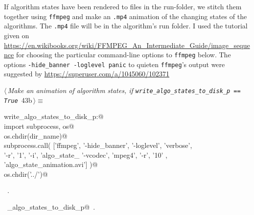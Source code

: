 \documentclass[11.5pt]{report}
\begin{document}
\vspace{-0.8cm}\newchunk If algorithm states have been rendered to files in the run-folder, we stitch them together using \verb|ffmpeg|
and make an \verb|.mp4| animation of the changing states of the algorithms. The \verb|.mp4| file will be in the algorithm's
run folder. I used the  tutorial given on \url{https://en.wikibooks.org/wiki/FFMPEG_An_Intermediate_Guide/image_sequence}
for choosing the particular command-line options to \verb|ffmpeg| below. The options \texttt{-hide\_banner -loglevel panic} 
to quieten \verb|ffmpeg|'s output were suggested by  \url{https://superuser.com/a/1045060/102371} 


\begin{flushleft} \small\label{scrap60}\raggedright\small
{} $\langle\,${\itshape Make an animation of algorithm states, if \verb|write_algo_states_to_disk_p == True|}\nobreak\ {\footnotesize {43b}}$\,\rangle\equiv$
\vspace{-1ex}
\begin{list}{}{} \item
\mbox{}\verb@if write_algo_states_to_disk_p:@\\
\mbox{}\verb@     import subprocess, os@\\
\mbox{}\verb@     os.chdir(dir_name)@\\
\mbox{}\verb@     subprocess.call( ['ffmpeg',  '-hide_banner', '-loglevel', 'verbose', \@\\
\mbox{}\verb@                       '-r', '1',  '-i', 'algo_state_%05d.png', \@\\
\mbox{}\verb@                       '-vcodec', 'mpeg4', '-r', '10' , \@\\
\mbox{}\verb@                       'algo_state_animation.avi']  )@\\
\mbox{}\verb@     os.chdir('../')@\\
\mbox{}\verb@@{\NWsep}
\end{list}
\vspace{-1.5ex}
\footnotesize
\begin{list}{}{\setlength{\itemsep}{-\parsep}\setlength{\itemindent}{-\leftmargin}}
\item \NWtxtMacroRefIn\ .
\item \NWtxtIdentsUsed\nobreak\  \verb@write_algo_states_to_disk_p@\nobreak\ .
\item{}
\end{list}
\vspace{4ex}
\end{flushleft}
\end{document}
